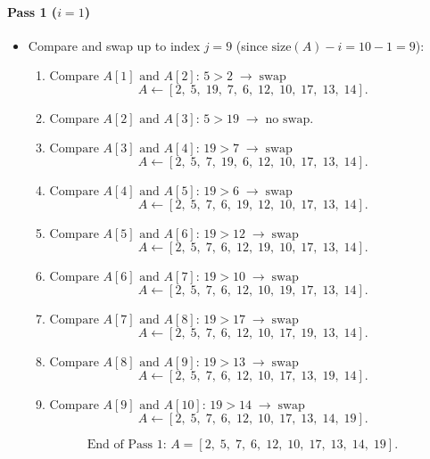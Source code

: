\documentclass{article}
\theoremstyle{remark}
\begin{document}
\paragraph{Pass 1 (\(i = 1\))} 
\begin{itemize}
  \item Compare and swap up to index \(j = 9\) (since \(\text{size}(A) - i = 10 - 1 = 9\)):
  \begin{enumerate}
    \item \(\text{Compare }A[1]\text{ and }A[2]:\, 5 > 2\;\rightarrow\;\text{swap} \)
      \[
        A \leftarrow [2,\;5,\;19,\;7,\;6,\;12,\;10,\;17,\;13,\;14].
      \]
    \item \(\text{Compare }A[2]\text{ and }A[3]:\, 5 > 19\;\rightarrow\;\text{no swap}.\)
    \item \(\text{Compare }A[3]\text{ and }A[4]:\, 19 > 7\;\rightarrow\;\text{swap}\)
      \[
        A \leftarrow [2,\;5,\;7,\;19,\;6,\;12,\;10,\;17,\;13,\;14].
      \]
    \item \(\text{Compare }A[4]\text{ and }A[5]:\, 19 > 6\;\rightarrow\;\text{swap}\)
      \[
        A \leftarrow [2,\;5,\;7,\;6,\;19,\;12,\;10,\;17,\;13,\;14].
      \]
    \item \(\text{Compare }A[5]\text{ and }A[6]:\, 19 > 12\;\rightarrow\;\text{swap}\)
      \[
        A \leftarrow [2,\;5,\;7,\;6,\;12,\;19,\;10,\;17,\;13,\;14].
      \]
    \item \(\text{Compare }A[6]\text{ and }A[7]:\, 19 > 10\;\rightarrow\;\text{swap}\)
      \[
        A \leftarrow [2,\;5,\;7,\;6,\;12,\;10,\;19,\;17,\;13,\;14].
      \]
    \item \(\text{Compare }A[7]\text{ and }A[8]:\, 19 > 17\;\rightarrow\;\text{swap}\)
      \[
        A \leftarrow [2,\;5,\;7,\;6,\;12,\;10,\;17,\;19,\;13,\;14].
      \]
    \item \(\text{Compare }A[8]\text{ and }A[9]:\, 19 > 13\;\rightarrow\;\text{swap}\)
      \[
        A \leftarrow [2,\;5,\;7,\;6,\;12,\;10,\;17,\;13,\;19,\;14].
      \]
    \item \(\text{Compare }A[9]\text{ and }A[10]:\, 19 > 14\;\rightarrow\;\text{swap}\)
      \[
        A \leftarrow [2,\;5,\;7,\;6,\;12,\;10,\;17,\;13,\;14,\;19].
      \]
  \end{enumerate}
  \[
    \text{End of Pass 1: } A = [2,\;5,\;7,\;6,\;12,\;10,\;17,\;13,\;14,\;19].
  \]
\end{itemize}
\end{document}
